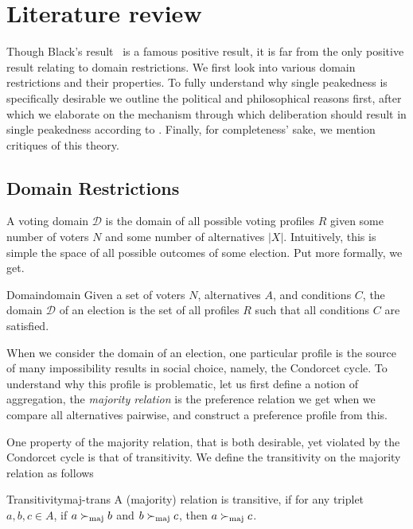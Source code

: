 \newpage
\chapter{Literature review}
\label{Literature}


Though Black's result~\citep{blackRationaleGroupDecisionmaking1948} is a famous positive result, it is far from the only positive result relating to domain restrictions. We first look into various domain restrictions and their properties. To fully understand why single peakedness is specifically desirable we outline the political and philosophical reasons first, after which we elaborate on the mechanism through which deliberation should result in single peakedness according to \citet{listTwoConceptsAgreement2002}. Finally, for completeness' sake, we mention critiques of this theory.

\section{Domain Restrictions}
A voting domain $\mathcal{D}$ is the domain of all possible voting profiles \(R\) given some number of voters $N$ and some number of alternatives $|X|$. Intuitively, this is simple the space of all possible outcomes of some election. Put more formally, we get.

\begin{definition}{Domain}{domain}
	{
		Given a set of voters $N$, alternatives $A$, and conditions $C$, the domain $\mathcal{D}$ of an election is the set of all profiles $R$ such that all conditions $C$ are satisfied.
	}
\end{definition}

When we consider the domain of an election, one particular profile is the source of many impossibility results in social choice, namely, the Condorcet cycle. To understand why this profile is problematic, let us first define a notion of aggregation, the \textit{majority relation} is the preference relation we get when we compare all alternatives pairwise, and construct a preference profile from this.


One property of the majority relation, that is both desirable, yet violated by the Condorcet cycle is that of transitivity. We define the transitivity on the majority relation as follows

\begin{definition}{Transitivity}{maj-trans}
	A (majority) relation is transitive, if for any triplet $a, b, c \in A$, if $a \succ_{\textnormal{maj}} b$ and $b \succ_{\textnormal{maj}} c$, then $a \succ_{\textnormal{maj}} c$.
\end{definition}

